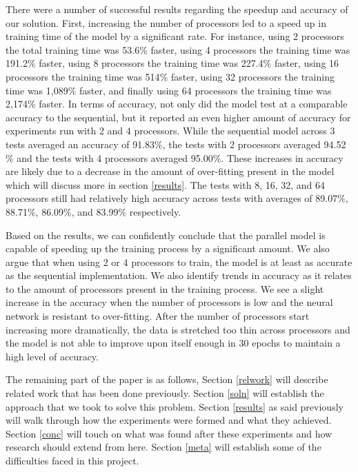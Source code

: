\documentclass[11pt,twocolumn]{article}
\begin{document}
There were a number of successful results regarding the speedup and accuracy of our solution. First, increasing the number of processors led to a speed up in training time of the model by a significant rate. For instance, using 2 processors the total training time was 53.6$\%$ faster, using 4 processors the training time was 191.2$\%$ faster, using 8 processors the training time was 227.4$\%$ faster, using 16 processors the training time was 514$\%$ faster, using 32 processors the training time was 1,089$\%$ faster, and finally using 64 processors the training time was 2,174$\%$ faster. In terms of accuracy, not only did the model test at a comparable accuracy to the sequential, but it reported an even higher amount of accuracy for experiments run with 2 and 4 processors. While the sequential model across 3 tests averaged an accuracy of 91.83$\%$, the tests with 2 processors averaged 94.52$\%$ and the tests with 4 processors averaged 95.00$\%$. These increases in accuracy are likely due to a decrease in the amount of over-fitting present in the model which will discuss more in section \ref{results}. The tests with 8, 16, 32, and 64 processors still had relatively high accuracy across tests with averages of 89.07$\%$, 88.71$\%$, 86.09$\%$, and 83.99$\%$ respectively.

Based on the results, we can confidently conclude that the parallel model is capable of speeding up the training process by a significant amount. We also argue that when using 2 or 4 processors to train, the model is at least as accurate as the sequential implementation. We also identify trends in accuracy as it relates to the amount of processors present in the training process. We see a slight increase in the accuracy when the number of processors is low and the neural network is resistant to over-fitting. After the number of processors start increasing more dramatically, the data is stretched too thin across processors and the model is not able to improve upon itself enough in 30 epochs to maintain a high level of accuracy.

The remaining part of the paper is as follows, Section \ref{relwork} will describe related work that has been done previously. Section \ref{soln} will establish the approach that we took to solve this problem. Section \ref{results} as said previously will walk through how the experiments were formed and what they achieved. Section \ref{conc} will touch on what was found after these experiments and how research should extend from here. Section \ref{meta} will establish some of the difficulties faced in this project. 
\end{document}
